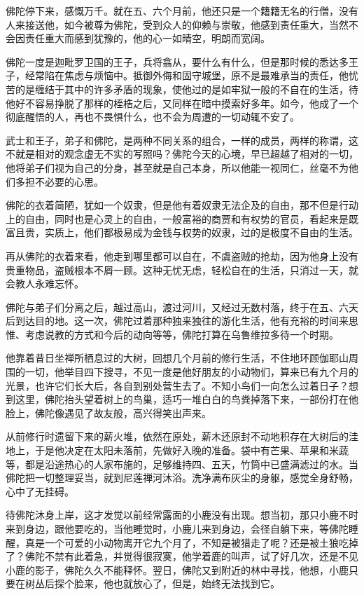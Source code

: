 \documentclass[12pt,twoside,openany]{book}
\begin{document}
佛陀停下来，感慨万千。就在五、六个月前，他还只是一个籍籍无名的行僧，没有人来接送他，如今被尊为佛陀，受到众人的仰赖与崇敬，他感到责任重大，当然不会因责任重大而感到犹豫的，他的心一如晴空，明朗而宽阔。

佛陀一度是迦毗罗卫国的王子，兵将翕从，要什么有什么，但是那时候的悉达多王子，经常陷在焦虑与烦恼中。抵御外侮和固守城堡，原不是最难承当的责任，他忧苦的是缠结于其中的许多矛盾的现象，使他过的是如牢狱一般的不自在的生活，待他好不容易挣脱了那样的桎梏之后，又同样在暗中摸索好多年。如今，他成了一个彻底醒悟的人，再也不畏惧什么，也不会为周遭的一切动辄不安了。

武士和王子，弟子和佛陀，是两种不同关系的组合，一样的成员，两样的称谓，这不就是相对的观念虚无不实的写照吗？佛陀今天的心境，早已超越了相对的一切，他将弟子们视为自己的分身，甚至就是自己本身，所以他能一视同仁，丝毫不为他们多担不必要的心思。

佛陀的衣着简陋，犹如一个奴隶，但是他有着奴隶无法企及的自由，那不但是行动上的自由，同时也是心灵上的自由，一般富裕的商贾和有权势的官员，看起来是既富且贵，实质上，他们都极易成为金钱与权势的奴隶，过的是极度不自由的生活。

再从佛陀的衣着来看，他走到哪里都可以自在，不虞盗贼的抢劫，因为他身上没有贵重物品，盗贼根本不屑一顾。这种无忧无虑，轻松自在的生活，只消过一天，就会教人永难忘怀。

佛陀与弟子们分离之后，越过高山，渡过河川，又经过无数村落，终于在五、六天后到达目的地。这一次，佛陀过着那种独来独往的游化生活，他有充裕的时间来思惟、考虑说教的方式和今后的动向等等，佛陀打算在乌鲁维拉多待一个时期。

他靠着昔日坐禅所栖息过的大树，回想几个月前的修行生活，不住地环顾伽耶山周围的一切，他举目四下搜寻，不见一度是他好朋友的小动物们，算来已有九个月的光景，也许它们长大后，各自到别处营生去了。不知小鸟们一向怎么过着日子？想到这里，佛陀抬头望着树上的鸟巢，适巧一堆白白的鸟粪掉落下来，一部份打在他脸上，佛陀像遇见了故友般，高兴得笑出声来。

从前修行时遗留下来的薪火堆，依然在原处，薪木还原封不动地积存在大树后的洼地上，于是他决定在太阳未落前，先做好入晚的准备。袋中有芒果、苹果和米蔬等，都是沿途热心的人家布施的，足够维持四、五天，竹筒中已盛满滤过的水。当佛陀把一切整理妥当，就到尼莲禅河沐浴。洗净满布灰尘的身躯，感觉全身舒畅，心中了无挂碍。

待佛陀沐身上岸，这才发觉以前经常露面的小鹿没有出现。想当初，那只小鹿不时来到身边，跟他要吃的，当他睡觉时，小鹿儿来到身边，会径自躺下来，等佛陀睡醒，真是一个可爱的小动物离开它九个月了，不知是被猎走了呢？还是被土狼吃掉了？佛陀不禁有此着急，并觉得很寂寞，他学着鹿的叫声，试了好几次，还是不见小鹿的影子，佛陀久久不能释怀。翌日，佛陀又到附近的林中寻找，他想，小鹿只要在树丛后探个脸来，他也就放心了，但是，始终无法找到它。
\end{document}
